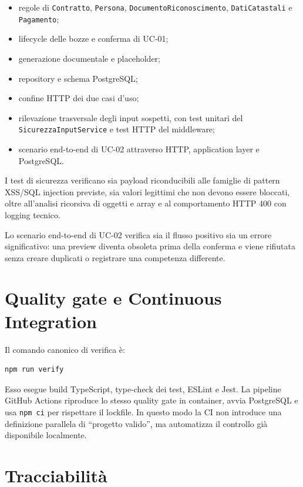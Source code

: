 \documentclass[11pt,a4paper]{article}
\begin{document}
\begin{itemize}
  \item regole di \texttt{Contratto}, \texttt{Persona}, \texttt{DocumentoRiconoscimento}, \texttt{DatiCatastali} e \texttt{Pagamento};
  \item lifecycle delle bozze e conferma di UC-01;
  \item generazione documentale e placeholder;
  \item repository e schema PostgreSQL;
  \item confine HTTP dei due casi d'uso;
  \item rilevazione trasversale degli input sospetti, con test unitari del \texttt{SicurezzaInputService} e test HTTP del middleware;
  \item scenario end-to-end di UC-02 attraverso HTTP, application layer e PostgreSQL.
\end{itemize}

I test di sicurezza verificano sia payload riconducibili alle famiglie di pattern XSS/SQL injection previste, sia valori legittimi che non devono essere bloccati, oltre all'analisi ricorsiva di oggetti e array e al comportamento HTTP 400 con logging tecnico.

Lo scenario end-to-end di UC-02 verifica sia il flusso positivo sia un errore significativo: una preview diventa obsoleta prima della conferma e viene rifiutata senza creare duplicati o registrare una competenza differente.

\section{Quality gate e Continuous Integration}

Il comando canonico di verifica è:

\begin{Verbatim}[fontsize=\small]
npm run verify
\end{Verbatim}

Esso esegue build TypeScript, type-check dei test, ESLint e Jest. La pipeline GitHub Actions riproduce lo stesso quality gate in container, avvia PostgreSQL e usa \texttt{npm ci} per rispettare il lockfile. In questo modo la CI non introduce una definizione parallela di ``progetto valido'', ma automatizza il controllo già disponibile localmente.

\section{Tracciabilità}
\end{document}
